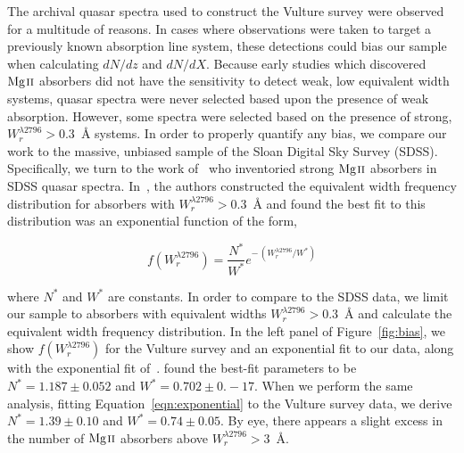 \documentclass[iop,apj,numberedappendix,appendixfloats,twocolappendix]{emulateapj}
\begin{document}
\begin{figure*}[bth]
\caption{Left: The equivalent width frequency distribution for the Vulture survey in black compared to the exponential fit of~\cite{Nestor2005}, shown as the orange dashed line, and an exponential fit to the Vulture survey data in purple. The exponential fits are of the form shown in~\ref{eqn:exponential}. Right: The cumulative distribution of the survey data and two comparative exponential fits. The P(K-S) value shown compares our survey's data to the fit from~\cite{Nestor2005}. }
\label{fig:bias}
\end{figure*}

The archival quasar spectra used to construct the Vulture survey were observed for a multitude of reasons. In cases where observations were taken to target a previously known absorption line system, these detections could bias our sample when calculating $dN\!/dz$ and $dN\!/dX$. Because early studies which discovered ${\hbox{{\rm Mg}\kern 0.1em{\sc ii}}}$ absorbers did not have the sensitivity to detect weak, low equivalent width systems, quasar spectra were never selected based upon the presence of weak absorption. However, some spectra were selected based on the presence of strong, $W_r^{\lambda2796} > 0.3$~{\AA} systems. In order to properly quantify any bias, we compare our work to the massive, unbiased sample of the Sloan Digital Sky Survey (SDSS). Specifically, we turn to the work of~\cite{Nestor2005} who inventoried strong ${\hbox{{\rm Mg}\kern 0.1em{\sc ii}}}$ absorbers in SDSS quasar spectra. In~\cite{Nestor2005}, the authors constructed the equivalent width frequency distribution for absorbers with $W_r^{\lambda2796} > 0.3$~{\AA} and found the best fit to this distribution was an exponential function of the form,

\begin{equation}
f(W_r^{\lambda2796}) = \frac{N^*}{W^*} e^{-\,\left(W_r^{\lambda2796} / W^*\right)}
\label{eqn:exponential}
\end{equation}

\noindent where $N^*$ and $W^*$ are constants. In order to compare to the SDSS data, we limit our sample to absorbers with equivalent widths $W_r^{\lambda2796} > 0.3$~{\AA} and calculate the equivalent width frequency distribution. In the left panel of Figure~\ref{fig:bias}, we show $f(W_r^{\lambda2796})$ for the Vulture survey and an exponential fit to our data, along with the exponential fit of~\cite{Nestor2005}. \cite{Nestor2005} found the best-fit parameters to be $N^* = 1.187 \pm 0.052$ and $W^* = 0.702 \pm 0.-17$. When we perform the same analysis, fitting Equation~\ref{eqn:exponential} to the Vulture survey data, we derive $N^* = 1.39 \pm 0.10$ and $W^* = 0.74 \pm 0.05$. By eye, there appears a slight excess in the number of ${\hbox{{\rm Mg}\kern 0.1em{\sc ii}}}$ absorbers above $W_r^{\lambda2796} > 3$~{\AA}.
\end{document}
